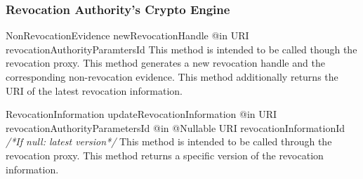  
      
      



  \subsubsection{Revocation Authority's Crypto Engine}
      
      \begin{method}
      {NonRevocationEvidence}
      {newRevocationHandle}
      {
        {@in URI revocationAuthorityParamtersId}
      }
      This method is intended to be called though the revocation proxy. This method generates
      a new revocation handle and the corresponding non-revocation evidence.
      This method additionally returns the URI of the latest revocation information.
      \end{method}
      
      \begin{method}
      {RevocationInformation}
      {updateRevocationInformation}
      {
        {@in URI revocationAuthorityParametersId}
        {@in @Nullable URI revocationInformationId \textrm{\textit{/*If null: latest version*/}}}
      }
      This method is intended to be called through the revocation proxy. This method returns
      a specific version of the revocation information.
      \end{method}

      
